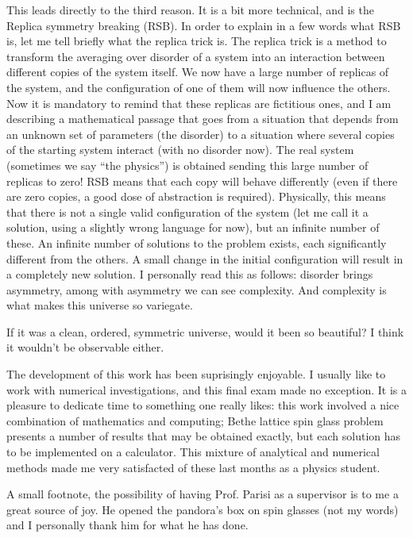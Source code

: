 This leads directly to the third reason. It is a bit more technical, and is the Replica symmetry breaking (RSB). In order to  explain in a few words what RSB is, let me tell briefly what the replica trick is.
The replica trick is a method to transform the averaging over disorder of a system into an interaction between different copies of the system itself. We now have a large number of replicas of the system, and the configuration of one of them will now influence the others. Now it is mandatory to remind that these replicas are fictitious ones, and I am describing a mathematical passage that goes from a situation that depends from an unknown set of parameters (the disorder) to a situation where several copies of the starting system interact (with no disorder now). The real system (sometimes we say \textquotedblleft the physics\textquotedblright) is obtained sending this large number of replicas to zero! RSB means that each copy will behave differently (even if there are zero copies, a good dose of abstraction is required). Physically, this means that there is not a single valid configuration of the system (let me call it a solution, using a slightly wrong language for now), but an infinite number of these. An infinite number of solutions to the problem exists, each significantly different from the others. A small change in the initial configuration will result in a completely new solution. I personally read this as follows: disorder brings asymmetry, among with asymmetry we can see complexity. And complexity is what makes this universe so variegate.

If it was a clean, ordered, symmetric universe, would it been so beautiful? I think it wouldn't be observable either.

\vspace{10 mm}

The development of this work has been suprisingly enjoyable. I usually like to work with numerical investigations, and this final exam made no exception. It is a pleasure to dedicate time to something one really likes: this work involved a nice combination of mathematics and computing; Bethe lattice spin glass problem presents a number of results that may be obtained exactly, but each solution has to be implemented on a calculator. This mixture of analytical and numerical methods made me very satisfacted of these last months as a physics student.

\vspace{10 mm}

A small footnote, the possibility of having Prof. Parisi as a supervisor is to me a great source of joy. He opened the pandora's box on spin glasses (not my words) and I personally thank him for what he has done.















